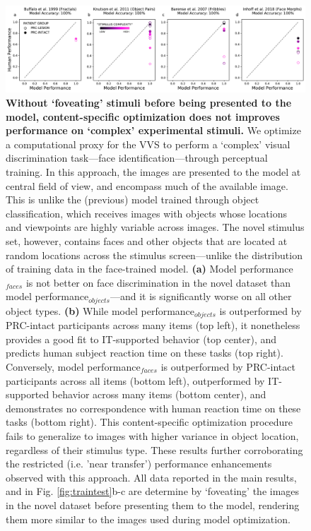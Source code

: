 \documentclass[11pt]{article}
\begin{document}
\begin{figure}[ht]
\centering
\includegraphics[width=\linewidth]{figures/S2}
\renewcommand{\figurename}{Supplementary Figure}
\caption{\textbf{ Without `foveating' stimuli before being presented to the model, content-specific optimization does not improves performance on `complex' experimental stimuli.} We optimize a computational proxy for the VVS to perform a ‘complex’ visual discrimination task---face identification---through perceptual training. In this approach, the images are presented to the model at central field of view, and encompass much of the available image. This is unlike the (previous) model trained through object classification, which receives images with objects whose locations and viewpoints are highly variable across images. The novel stimulus set, however, contains faces and other objects that are located at random locations across the stimulus screen---unlike the distribution of training data in the face-trained model. \textbf{(a)} Model performance$_{faces}$ is not better on face discrimination in the novel dataset than model performance$_{objects}$---and it is significantly worse on all other object types. \textbf{(b)} While model performance$_{objects}$ is outperformed by PRC-intact participants across many items (top left), it nonetheless provides a good fit to IT-supported behavior (top center), and predicts human subject reaction time on these tasks (top right). Conversely, model performance$_{faces}$ is outperformed by PRC-intact participants across all items (bottom left), outperformed by IT-supported behavior across many items (bottom center), and demonstrates no correspondence with human reaction time on these tasks (bottom right). This content-specific optimization procedure fails to generalize to images with higher variance in object location, regardless of their stimulus type. These results further corroborating the restricted (i.e. 'near transfer') performance enhancements observed with this approach. All data reported in the main results, and in Fig. \ref{fig:traintest}b-c are determine by `foveating' the images in the novel dataset before presenting them to the model, rendering them more similar to the images used during model optimization.}
\label{fig:compare_readouts_unfoveated}
\end{figure}
\end{document}
